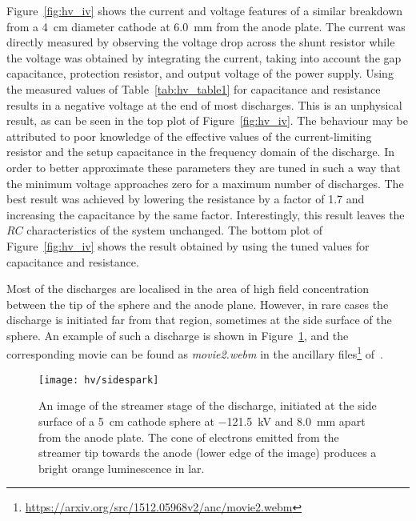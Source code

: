 Figure~\ref{fig:hv_iv} shows the current and voltage features of a similar breakdown from a \SI{4}{\centi\metre} diameter cathode at \SI{6.0}{\milli\metre} from the anode plate.
The current was directly measured by observing the voltage drop across the shunt resistor while the voltage was obtained by integrating the current, taking into account the gap capacitance, protection resistor, and output voltage of the power supply.
Using the measured values of Table~\ref{tab:hv_table1} for capacitance and resistance results in a negative voltage at the end of most discharges.
This is an unphysical result, as can be seen in the top plot of Figure~\ref{fig:hv_iv}.
The behaviour may be attributed to poor knowledge of the effective values of the current-limiting resistor and the setup capacitance in the frequency domain of the discharge.
In order to better approximate these parameters they are tuned in such a way that the minimum voltage approaches zero for a maximum number of discharges.
The best result was achieved by lowering the resistance by a factor of \num{1.7} and increasing the capacitance by the same factor.
Interestingly, this result leaves the $RC$ characteristics of the system unchanged.
The bottom plot of Figure~\ref{fig:hv_iv} shows the result obtained by using the tuned values for capacitance and resistance.

Most of the discharges are localised in the area of high field concentration between the tip of the sphere and the anode plane.
However, in rare cases the discharge is initiated far from that region, sometimes at the side surface of the sphere.
An example of such a discharge is shown in Figure~\ref{fig:hv_side}, and the corresponding movie can be found as \emph{movie2.webm} in the ancillary files\footnote{\url{https://arxiv.org/src/1512.05968v2/anc/movie2.webm}} of~\cite{breakdown_16}.

\begin{figure}[tbp]
	\centering	
	\texttt{[image: hv/sidespark]}
	\caption[ study streamer image]{%
		An image of the streamer stage of the discharge, initiated at the side surface of a \SI{5}{\centi\metre} cathode sphere at \SI{-121.5}{\kilo\volt} and \SI{8.0}{\milli\metre} apart from the anode plate.
		The cone of electrons emitted from the streamer tip towards the anode (lower edge of the image) produces a bright orange luminescence in \acrshort{lar}.
	}
	\label{fig:hv_side}
\end{figure}


